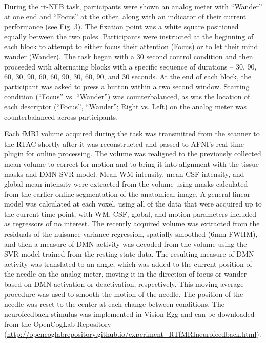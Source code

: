 During the rt-NFB task, participants were shown an analog meter with ``Wander'' at one end and     ``Focus'' at the other, along with an indicator of their current performance (see Fig. 3). The fixation point was a white square positioned equally between the two poles. Participants were instructed at the beginning of each block to attempt to either focus their attention (Focus) or to let their mind wander (Wander). The task began with a 30 second control condition and then proceeded with alternating blocks with a specific sequence of durations -- 30, 90, 60, 30, 90, 60, 60, 90, 30, 60, 90, and 30 seconds. At the end of each block, the participant was asked to press a button within a two second window. Starting condition (``Focus'' vs. ``Wander'') was counterbalanced, as was the location of each descriptor (``Focus'', ``Wander''; Right vs. Left) on the analog meter was counterbalanced across participants. 

Each fMRI volume acquired during the task was transmitted from the scanner to the RTAC shortly after it was reconstructed and passed to AFNI's real-time plugin \cite{Cox1995} for online processing. The volume was realigned to the previously collected mean volume to correct for motion and to bring it into alignment with the tissue masks and DMN SVR model. Mean WM intensity, mean CSF intensity, and global mean intensity were extracted from the volume using masks calculated from the earlier online segmentation of the anatomical image. A general linear model was calculated at each voxel, using all of the data that were acquired up to the current time point, with WM, CSF, global, and motion parameters included as regressors of no interest. The recently acquired volume was extracted from the residuals of the nuisance variance regression, spatially smoothed (6mm FWHM), and then a measure of DMN activity was decoded from the volume using the SVR model trained from the resting state data. The resulting measure of DMN activity was translated to an angle, which was added to the current position of the needle on the analog meter, moving it in the direction of focus or wander based on DMN activation or deactivation, respectively. This moving average procedure was used to smooth the motion of the needle. The position of the needle was reset to the center at each change between conditions. The neurofeedback stimulus was implemented in Vision Egg \cite{Straw2008} and can be downloaded from the OpenCogLab Repository (\href{http://opencoglabrepository.github.io/experiment_RTfMRIneurofeedback.html}{http://opencoglabrepository.github.io/experiment\_RTfMRIneurofeedback.html}).

